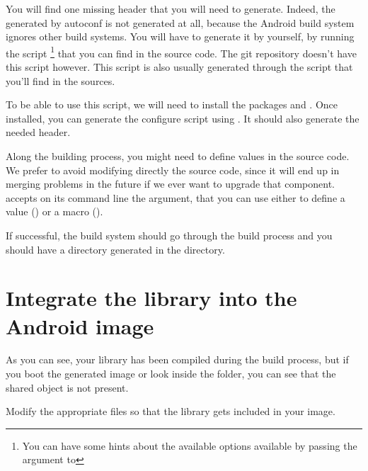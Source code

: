 You will find one missing header that you will need to
generate. Indeed, the  generated by autoconf is not
generated at all, because the Android build system ignores other build
systems. You will have to generate it by yourself, by running the
 script \footnote{You can have some hints about the
  available options available by passing the  argument to
  } that you can find in the  source
code. The git repository doesn't have this  script
however. This script is also usually generated through the
 script that you'll find in the sources.

To be able to use this script, we will need to install the packages
 and . Once installed, you can generate
the configure script using . It should also
generate the needed  header.

Along the building process, you might need to define values in the
source code. We prefer to avoid modifying directly the source code,
since it will end up in merging problems in the future if we ever want
to upgrade that component.  accepts on its command line the
 argument, that you can use either to define a value
() or a macro ().

If successful, the build system should go through the build process
and you should have a directory generated in the  directory.

\section{Integrate the library into the Android image}

As you can see, your library has been compiled during the build
process, but if you boot the generated image or look inside the
folder, you can see that the shared object is not present.

Modify the appropriate files so that the library gets included in your
image.
